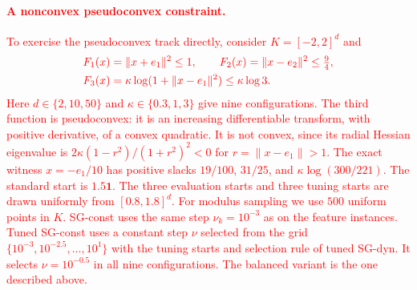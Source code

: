 \documentclass[]{interact}
\theoremstyle{plain}
\theoremstyle{definition}
\theoremstyle{remark}
\begin{document}
\paragraph*{\textcolor{red}{A nonconvex pseudoconvex constraint.}}
\leavevmode\textcolor{red}{To exercise the pseudoconvex track directly, consider $K=[-2,2]^d$ and}
\begin{equation}\label{eq:logball-test}\textcolor{red}{
\begin{aligned}
 F_1(x)&=\|x+e_1\|^2\le1,\qquad
 F_2(x)=\|x-e_2\|^2\le\tfrac94,\\
 F_3(x)&=\kappa\log(1+\|x-e_1\|^2)\le \kappa\log3.
\end{aligned}
}\end{equation}
\leavevmode\textcolor{red}{Here $d\in\{2,10,50\}$ and $\kappa\in\{0.3,1,3\}$ give nine configurations. The third function is pseudoconvex: it is an increasing differentiable transform, with positive derivative, of a convex quadratic. It is not convex, since its radial Hessian eigenvalue is $2\kappa(1-r^2)/(1+r^2)^2<0$ for $r=\|x-e_1\|>1$. The exact witness $x=-e_1/10$ has positive slacks $19/100$, $31/25$, and $\kappa\log(300/221)$. The standard start is $1.5\mathbf1$. The three evaluation starts and three tuning starts are drawn uniformly from $[0.8,1.8]^d$. For modulus sampling we use $500$ uniform points in $K$. SG-const uses the same step $\nu_k=10^{-3}$ as on the feature instances. Tuned SG-const uses a constant step $\nu$ selected from the grid $\{10^{-3},10^{-2.5},\ldots,10^1\}$ with the tuning starts and selection rule of tuned SG-dyn. It selects $\nu=10^{-0.5}$ in all nine configurations. The balanced variant is the one described above.}
\end{document}
